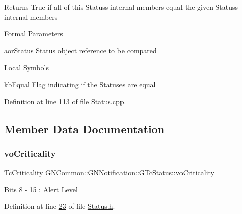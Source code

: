 \begin{DoxyReturn}{Returns}
True if all of this Status\textquotesingle{}s internal members equal the given Status\textquotesingle{}s internal members
\end{DoxyReturn}
\begin{DoxyParagraph}{Formal Parameters}

\begin{DoxyPre}{\ttfamily [ in ]  aorStatus    Status object reference to be compared }\end{DoxyPre}

\end{DoxyParagraph}
\begin{DoxyParagraph}{Local Symbols}

\begin{DoxyPre}{\ttfamily  kbEqual    Flag indicating if the Statuses are equal }\end{DoxyPre}
 
\end{DoxyParagraph}


Definition at line \mbox{\hyperlink{_status_8cpp_source_l00113}{113}} of file \mbox{\hyperlink{_status_8cpp_source}{Status.\+cpp}}.



\subsection{Member Data Documentation}
\mbox{\label{class_g_n_common_1_1_g_n_notification_1_1_g_tc_status_ae586e45eb3008c2992da2868cd1562ad}} 
\subsubsection{\texorpdfstring{vo\+Criticality}{voCriticality}}
{\footnotesize\ttfamily \mbox{\hyperlink{namespace_g_n_common_1_1_g_n_notification_ac544f67a385924ba649033c93a8793eb}{Tc\+Criticality}} G\+N\+Common\+::\+G\+N\+Notification\+::\+G\+Tc\+Status\+::vo\+Criticality}

Bits 8 -\/ 15 \+: Alert Level 

Definition at line \mbox{\hyperlink{_status_8h_source_l00023}{23}} of file \mbox{\hyperlink{_status_8h_source}{Status.\+h}}.

